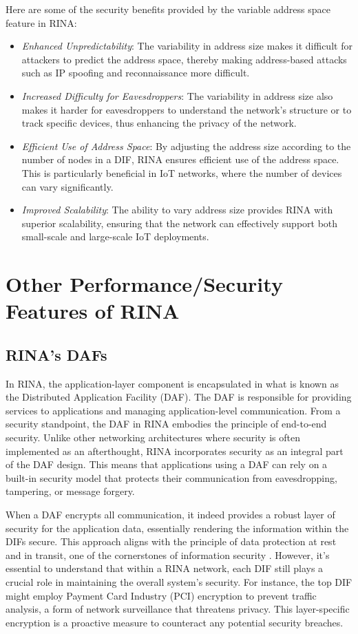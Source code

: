 \documentclass{ieeeaccess}
\begin{document}
Here are some of the security benefits provided by the variable address space feature in RINA:

\begin{itemize}
	\item \textit{Enhanced Unpredictability}: The variability in address size makes it difficult for attackers to predict the address space, thereby making address-based attacks such as IP spoofing and reconnaissance more difficult.
	\item \textit{Increased Difficulty for Eavesdroppers}: The variability in address size also makes it harder for eavesdroppers to understand the network's structure or to track specific devices, thus enhancing the privacy of the network.
	\item \textit{Efficient Use of Address Space}: By adjusting the address size according to the number of nodes in a DIF, RINA ensures efficient use of the address space. This is particularly beneficial in IoT networks, where the number of devices can vary significantly.
	\item \textit{Improved Scalability}: The ability to vary address size provides RINA with superior scalability, ensuring that the network can effectively support both small-scale and large-scale IoT deployments.
\end{itemize}

\section{Other Performance/Security Features of RINA} 
\label{sec:rina-other}
\subsection{RINA's DAFs}
In RINA, the application-layer component is encapsulated in what is known as the Distributed Application Facility (DAF). The DAF is responsible for providing services to applications and managing application-level communication. From a security standpoint, the DAF in RINA embodies the principle of end-to-end security. Unlike other networking architectures where security is often implemented as an afterthought, RINA incorporates security as an integral part of the DAF design. This means that applications using a DAF can rely on a built-in security model that protects their communication from eavesdropping, tampering, or message forgery.

When a DAF encrypts all communication, it indeed provides a robust layer of security for the application data, essentially rendering the information within the DIFs secure. This approach aligns with the principle of data protection at rest and in transit, one of the cornerstones of information security \cite{kunchok2018lightweight}. However, it's essential to understand that within a RINA network, each DIF still plays a crucial role in maintaining the overall system's security. For instance, the top DIF might employ Payment Card Industry (PCI) encryption \cite{liu2010survey} to prevent traffic analysis, a form of network surveillance that threatens privacy. This layer-specific encryption is a proactive measure to counteract any potential security breaches.
\end{document}

